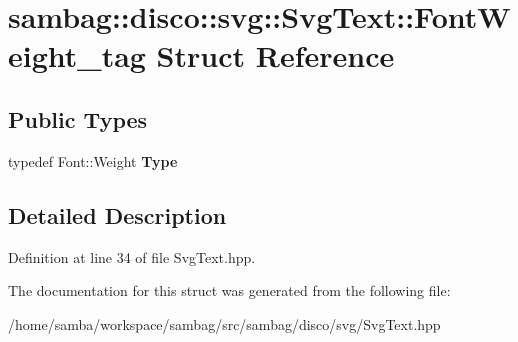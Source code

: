 \hypertarget{structsambag_1_1disco_1_1svg_1_1_svg_text_1_1_font_weight__tag}{
\section{sambag::disco::svg::SvgText::FontWeight\_\-tag Struct Reference}
\label{structsambag_1_1disco_1_1svg_1_1_svg_text_1_1_font_weight__tag}
}
\subsection*{Public Types}
\begin{DoxyCompactItemize}
\item 
\hypertarget{structsambag_1_1disco_1_1svg_1_1_svg_text_1_1_font_weight__tag_a8e1d1e6f810359dbbf0f7270e0d96cbe}{
typedef Font::Weight {\bfseries Type}}
\label{structsambag_1_1disco_1_1svg_1_1_svg_text_1_1_font_weight__tag_a8e1d1e6f810359dbbf0f7270e0d96cbe}

\end{DoxyCompactItemize}


\subsection{Detailed Description}


Definition at line 34 of file SvgText.hpp.



The documentation for this struct was generated from the following file:\begin{DoxyCompactItemize}
\item 
/home/samba/workspace/sambag/src/sambag/disco/svg/SvgText.hpp\end{DoxyCompactItemize}
